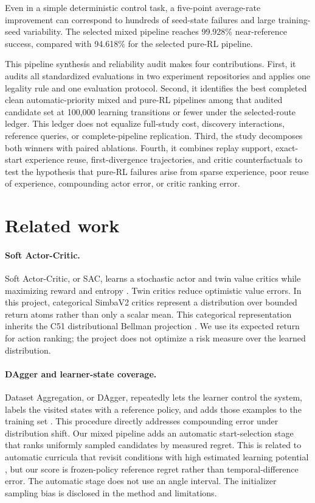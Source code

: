 \documentclass[10pt,twocolumn]{article}
\begin{document}
Even in a simple deterministic control task, a five-point average-rate improvement can correspond to hundreds of seed-state failures and large training-seed variability. The selected mixed pipeline reaches 99.928\% near-reference success, compared with 94.618\% for the selected pure-RL pipeline.

This pipeline synthesis and reliability audit makes four contributions. First, it audits all standardized evaluations in two experiment repositories and applies one legality rule and one evaluation protocol. Second, it identifies the best completed clean automatic-priority mixed and pure-RL pipelines among that audited candidate set at 100,000 learning transitions or fewer under the selected-route ledger. This ledger does not equalize full-study cost, discovery interactions, reference queries, or complete-pipeline replication. Third, the study decomposes both winners with paired ablations. Fourth, it combines replay support, exact-start experience reuse, first-divergence trajectories, and critic counterfactuals to test the hypothesis that pure-RL failures arise from sparse experience, poor reuse of experience, compounding actor error, or critic ranking error.

\section{Related work}

\paragraph{Soft Actor-Critic.}
Soft Actor-Critic, or SAC, learns a stochastic actor and twin value critics while maximizing reward and entropy \cite{haarnoja2018sac}. Twin critics reduce optimistic value errors. In this project, categorical SimbaV2 critics represent a distribution over bounded return atoms rather than only a scalar mean.
This categorical representation inherits the C51 distributional Bellman projection \cite{bellemare2017distributional}. We use its expected return for action ranking; the project does not optimize a risk measure over the learned distribution.

\paragraph{DAgger and learner-state coverage.}
Dataset Aggregation, or DAgger, repeatedly lets the learner control the system, labels the visited states with a reference policy, and adds those examples to the training set \cite{ross2011dagger}. This procedure directly addresses compounding error under distribution shift. Our mixed pipeline adds an automatic start-selection stage that ranks uniformly sampled candidates by measured regret. This is related to automatic curricula that revisit conditions with high estimated learning potential \cite{jiang2021plr}, but our score is frozen-policy reference regret rather than temporal-difference error. The automatic stage does not use an angle interval. The initializer sampling bias is disclosed in the method and limitations.
\end{document}
